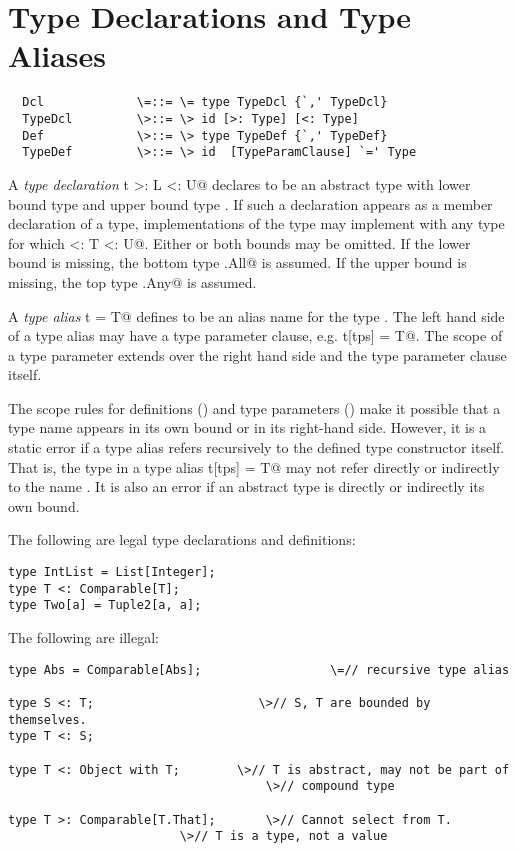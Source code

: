 \documentclass[11pt]{report}
\begin{document}
\section{Type Declarations and Type Aliases}
\label{sec:typedcl}
\label{sec:typealias}

\syntax\begin{verbatim}
  Dcl             \=::= \= type TypeDcl {`,' TypeDcl}
  TypeDcl         \>::= \> id [>: Type] [<: Type]
  Def             \>::= \> type TypeDef {`,' TypeDef}
  TypeDef         \>::= \> id  [TypeParamClause] `=' Type
\end{verbatim}

A {\em type declaration} \verb@type t >: L <: U@ declares \verb@t@ to
be an abstract type with lower bound type \verb@L@ and upper bound
type \verb@U@.  If such a declaration appears as a member declaration
of a type, implementations of the type may implement \verb@t@ with any
type \verb@T@ for which \verb@L <: T <: U@. Either or both bounds may
be omitted.  If the lower bound \verb@L@ is missing, the bottom type
\verb@scala.All@ is assumed.  If the upper bound \verb@U@ is missing,
the top type \verb@scala.Any@ is assumed.

A {\em type alias} \verb@type t = T@ defines \verb@t@ to be an alias
name for the type \verb@T@.  The left hand side of a type alias may
have a type parameter clause, e.g. \verb@type t[tps] = T@.  The scope
of a type parameter extends over the right hand side \verb@T@ and the
type parameter clause \verb@tps@ itself.  

The scope rules for definitions () and type parameters
() make it possible that a type name appears in its
own bound or in its right-hand side.  However, it is a static error if
a type alias refers recursively to the defined type constructor itself.  
That is, the type \verb@T@ in a type alias \verb@type t[tps] = T@ may not refer
directly or indirectly to the name \verb@t@.  It is also an error if
an abstract type is directly or indirectly its own bound.

\example The following are legal type declarations and definitions:
\begin{verbatim}
type IntList = List[Integer];
type T <: Comparable[T];
type Two[a] = Tuple2[a, a];
\end{verbatim}

The following are illegal:
\begin{verbatim}
type Abs = Comparable[Abs];	                 \=// recursive type alias

type S <: T;                       \>// S, T are bounded by themselves.
type T <: S;

type T <: Object with T;	    \>// T is abstract, may not be part of
                                    \>// compound type

type T >: Comparable[T.That];       \>// Cannot select from T.
			            \>// T is a type, not a value
\end{verbatim}
\end{document}
